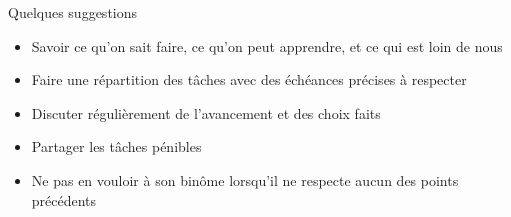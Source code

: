 \documentclass{beamer}
\begin{document}
\begin{frame}{Quelques suggestions}
	\begin{itemize}
		\item Savoir ce qu'on sait faire, ce qu'on peut apprendre, et ce qui est loin de nous \pause
		\item Faire une répartition des tâches avec des échéances précises à respecter\pause
		\item Discuter régulièrement de l'avancement et des choix faits\pause
		\item Partager les tâches pénibles\pause
		\item Ne pas en vouloir à son binôme lorsqu'il ne respecte aucun des points précédents \pause
	\end{itemize}

\end{frame}
\end{document}
